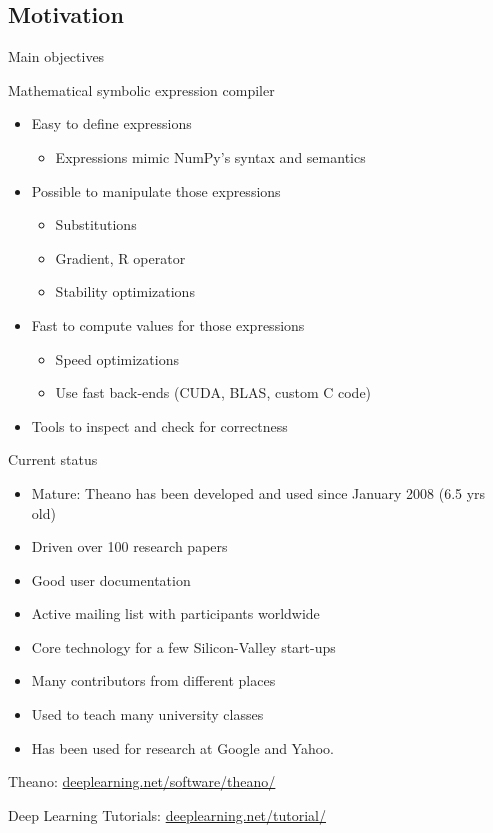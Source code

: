 \documentclass[a4paper,9pt]{beamer}
\begin{document}
\subsection{Motivation}

\begin{frame}{Main objectives}

  Mathematical symbolic expression compiler

  \begin{itemize}
    \item Easy to define expressions
      \begin{itemize}
        \item Expressions mimic NumPy's syntax and semantics
      \end{itemize}
    \item Possible to manipulate those expressions
      \begin{itemize}
        \item Substitutions
        \item Gradient, R operator
        \item Stability optimizations
      \end{itemize}
    \item Fast to compute values for those expressions
      \begin{itemize}
        \item Speed optimizations
        \item Use fast back-ends (CUDA, BLAS, custom C code)
      \end{itemize}
    \item Tools to inspect and check for correctness
  \end{itemize}
\end{frame}

\begin{frame}{Current status}
  \begin{itemize}
    \item Mature: Theano has been developed and used since January 2008 (6.5 yrs old)
    \item Driven over 100 research papers
    \item Good user documentation
    \item Active mailing list with participants worldwide
    \item Core technology for a few Silicon-Valley start-ups
    \item Many contributors from different places
    \item Used to teach many university classes
    \item Has been used for research at Google and Yahoo.
  \end{itemize}
  Theano: \url{deeplearning.net/software/theano/}

  Deep Learning Tutorials: \url{deeplearning.net/tutorial/}
  \end{frame}
\end{document}
